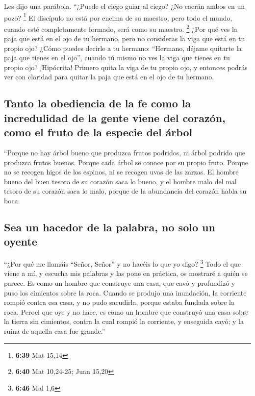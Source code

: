 \begin{paracol}{2}
 Les dijo una parábola. ``¿Puede el ciego guiar al ciego?
¿No caerán ambos en un pozo? \footnote{\textbf{6:39} Mat 15,14}
 El discípulo no está por encima de su maestro, pero todo
el mundo, cuando esté completamente formado, será como su maestro.
\footnote{\textbf{6:40} Mat 10,24-25; Juan 15,20}  ¿Por
qué ves la paja que está en el ojo de tu hermano, pero no consideras la
viga que está en tu propio ojo?  ¿Cómo puedes decirle a
tu hermano: ``Hermano, déjame quitarte la paja que tienes en el ojo'',
cuando tú mismo no ves la viga que tienes en tu propio ojo? ¡Hipócrita!
Primero quita la viga de tu propio ojo, y entonces podrás ver con
claridad para quitar la paja que está en el ojo de tu hermano.

\hypertarget{tanto-la-obediencia-de-la-fe-como-la-incredulidad-de-la-gente-viene-del-corazuxf3n-como-el-fruto-de-la-especie-del-uxe1rbol}{%
\subsection{Tanto la obediencia de la fe como la incredulidad de la
gente viene del corazón, como el fruto de la especie del
árbol}\label{tanto-la-obediencia-de-la-fe-como-la-incredulidad-de-la-gente-viene-del-corazuxf3n-como-el-fruto-de-la-especie-del-uxe1rbol}}

 ``Porque no hay árbol bueno que produzca frutos
podridos, ni árbol podrido que produzca frutos buenos. 
Porque cada árbol se conoce por su propio fruto. Porque no se recogen
higos de los espinos, ni se recogen uvas de las zarzas. 
El hombre bueno del buen tesoro de su corazón saca lo bueno, y el hombre
malo del mal tesoro de su corazón saca lo malo, porque de la abundancia
del corazón habla su boca.

\hypertarget{sea-un-hacedor-de-la-palabra-no-solo-un-oyente}{%
\subsection{Sea un hacedor de la palabra, no solo un
oyente}\label{sea-un-hacedor-de-la-palabra-no-solo-un-oyente}}

 ``¿Por qué me llamáis ``Señor, Señor'' y no hacéis lo
que yo digo? \footnote{\textbf{6:46} Mal 1,6}  Todo el
que viene a mí, y escucha mis palabras y las pone en práctica, os
mostraré a quién se parece.  Es como un hombre que
construye una casa, que cavó y profundizó y puso los cimientos sobre la
roca. Cuando se produjo una inundación, la corriente rompió contra esa
casa, y no pudo sacudirla, porque estaba fundada sobre la roca.
 Peroel que oye y no hace, es como un hombre que
construyó una casa sobre la tierra sin cimientos, contra la cual rompió
la corriente, y enseguida cayó; y la ruina de aquella casa fue grande.''


\end{paracol}
